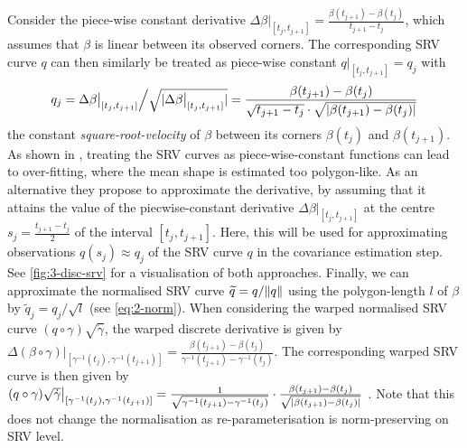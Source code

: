 Consider the piece-wise constant derivative $\Delta \beta \big\rvert_{[t_j, t_{j+1}]} = \frac{\beta(t_{j+1}) - \beta(t_{j})}{t_{j+1} - t_j}$, which assumes that $\beta$ is linear between its observed corners. 
The corresponding SRV curve $q$ can then similarly be treated as piece-wise constant $q\big\rvert_{[t_{j},t_{j+1}]} = q_j$ with 
\begin{equation}
  q_j = \Delta \beta \big\rvert_{[t_j, t_{j+1}]} \Big/ \sqrt{\lvert\Delta \beta \big\rvert_{[t_j, t_{j+1}]}\rvert} = \frac{\beta(t_{j+1}) - \beta(t_j)}{\sqrt{t_{j+1} - t_j} \cdot \sqrt{\lvert\beta(t_{j+1}) - \beta(t_j)\rvert}}
\end{equation}
the constant \emph{square-root-velocity} of $\beta$ between its corners $\beta(t_j)$ and $\beta(t_{j+1})$.
As shown in \cite[][Fig.\ 3]{Steyer2021}, treating the SRV curves as piece-wise-constant functions can lead to over-fitting, where the mean shape is estimated too polygon-like.
As an alternative they propose to approximate the derivative, by assuming that it attains the value of the piecwise-constant derivative $\Delta \beta \big\rvert_{[t_j,t_{j+1}]}$ at the centre $s_j = \frac{t_{j+1} - t_j}{2}$ of the interval $[t_j, t_{j+1}]$.
Here, this will be used for approximating observations $q(s_j) \approx q_j$ of the SRV curve $q$ in the covariance estimation step.
See \cref{fig:3-disc-srv} for a visualisation of both approaches.
Finally, we can approximate the normalised SRV curve $\widetilde q = q / \lVert q\rVert$ using the polygon-length $l$ of $\beta$ by $\widetilde q_j = q_j \big/ \sqrt{l}$ (see \cref{eq:2-norm}).
When considering the warped normalised SRV curve $(q \circ \gamma ) \sqrt{\dot\gamma}$, the warped discrete derivative is given by $\Delta (\beta \circ \gamma) \big\rvert_{[\gamma^{-1}(t_j), \gamma^{-1}(t_{j+1})]} = \frac{\beta(t_{j+1}) - \beta(t_{j})}{\gamma^{-1}(t_{j+1}) - \gamma^{-1}(t_j)}$.
The corresponding warped SRV curve is then given by $(q \circ \gamma) \sqrt{\dot\gamma} \big\rvert_{[\gamma^{-1}(t_j), \gamma^{-1}(t_{j+1})]} = \frac{1}{\sqrt{\gamma^{-1}(t_{j+1}) - \gamma^{-1}(t_j)}} \cdot \frac{\beta(t_{j+1}) - \beta(t_j)}{\sqrt{\lvert\beta(t_{j+1}) - \beta(t_j)\rvert}}$ \parencite[see][]{Steyer2021}.
Note that this does not change the normalisation as re-parameterisation is norm-preserving on SRV level.


